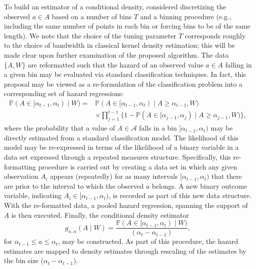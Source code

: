 To build an estimator of a conditional density, \citet{diaz2011super} considered
discretizing the observed $a \in A$ based on a number of bins $T$ and a binning
procedure (e.g., including the same number of points in each bin or forcing
bins to be of the same length). We note that the choice of the tuning parameter
$T$ corresponds roughly to the choice of bandwidth in classical kernel density
estimation; this will be made clear upon further examination of the proposed
algorithm. The data $\{A, W\}$ are reformatted such that the hazard of an
observed value $a \in A$ falling in a given bin may be evaluated via standard
classification techniques. In fact, this proposal may be viewed as
a re-formulation of the classification problem into a corresponding set of
hazard regressions:
\begin{align*}
   \mathbb{P} (A \in [\alpha_{t-1}, \alpha_t) \mid W) = &\mathbb{P} (A \in
   [\alpha_{t-1}, \alpha_t) \mid A \geq \alpha_{t-1}, W)\\ &\times
   \prod_{j = 1}^{t -1} \{1 - \mathbb{P} (A \in [\alpha_{j-1}, \alpha_j)
   \mid A \geq \alpha_{j-1}, W) \},
\end{align*}
where the probability that a value of $A \in \mathcal{A}$ falls in a bin
$[\alpha_{t-1}, \alpha_t)$ may be directly estimated from a standard
classification model. The likelihood of this model may be re-expressed in terms
of the likelihood of a binary variable in a data set expressed through
a repeated measures structure. Specifically, this re-formatting procedure is
carried out by creating a data set in which any given observation $A_i$ appears
(repeatedly) for as many intervals $[\alpha_{t-1}, \alpha_t)$ that there are
prior to the interval to which the observed $a$ belongs. A new binary outcome
variable, indicating $A_i \in [\alpha_{t-1}, \alpha_t)$, is recorded as part of
this new data structure. With the re-formatted data, a pooled hazard regression,
spanning the support of $A$ is then executed. Finally, the conditional density
estimator
\begin{equation*}
   g_{n, \alpha}(A \mid W) = \frac{\mathbb{P}(A \in [\alpha_{t-1}, \alpha_t)
      \mid W)}{(\alpha_t - \alpha_{t-1})},
\end{equation*}
for $\alpha_{t-1} \leq a \le \alpha_t$, may be constructed. As part of this
procedure, the hazard estimates are mapped to density estimates through
rescaling of the estimates by the bin size ($\alpha_t - \alpha_{t-1}$).

